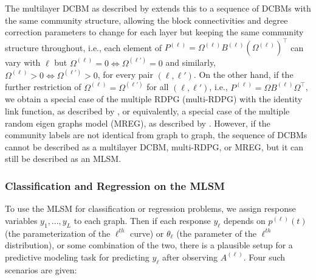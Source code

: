 \documentclass[12pt]{article}
\begin{document}
\begin{example}
The multilayer DCBM as described by \citet{agterberg2022joint} extends this to a sequence of DCBMs with the same community structure, allowing the block connectivities and degree correction parameters to change for each layer but keeping the same community structure throughout, i.e., each element of $P^{(\ell)} = \Omega^{(\ell)} B^{(\ell)} (\Omega^{(\ell)})^\top$ can vary with $\ell$ but $\Omega^{(\ell)} = 0 \iff \Omega^{(\ell')} = 0$ and similarly, $\Omega^{(\ell)} > 0 \iff \Omega^{(\ell')} > 0$, for every pair $(\ell, \ell')$. 
On the other hand, if the further restriction of $\Omega^{(\ell)} = \Omega^{(\ell')}$ for all $(\ell, \ell')$, i.e., $P^{(\ell)} = \Omega B^{(\ell)} \Omega^\top$, we obtain a special case of the multiple RDPG (multi-RDPG) with the identity link function, as described by \citet{nielsen2018multiple}, or equivalently, a special case of the multiple random eigen graphs model (MREG), as described by \citet{8889404}. 
However, if the community labels are not identical from graph to graph, the sequence of DCBMs cannot be described as a multilayer DCBM, multi-RDPG, or MREG, but it can still be described as an MLSM. 
\end{example}

\begin{example}
\end{example}

\subsubsection{Classification and Regression on the
MLSM}\label{classification-and-regression-on-the-mlsm}

To use the MLSM for classification or regression problems, we assign
response variables \(y_1, ..., y_L\) to each graph. Then if each
response \(y_\ell\) depends on \(p^{(\ell)}(t)\) (the parameterization
of the \(\ell^{th}\) curve) or \(\theta_\ell\) (the parameter of the
\(\ell^{th}\) distribution), or some combination of the two, there is a
plausible setup for a predictive modeling task for predicting \(y_\ell\)
after observing \(A^{(\ell)}\). Four such scenarios are given:
\end{document}
